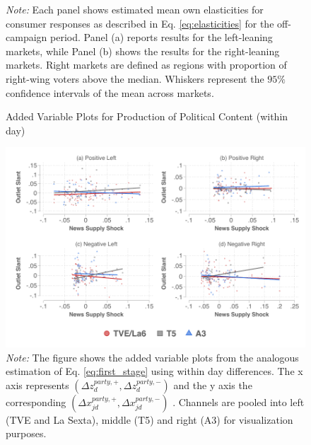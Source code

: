 \documentclass[12pt]{article}
\begin{document}
\begin{figure}[!htbp]
		\vspace{0.5em} %
		
		\captionsetup{justification=justified}
		\caption*{\small \textit{Note:} Each panel shows estimated mean own elasticities for consumer responses  as described in Eq. \eqref{eq:elasticities} for the off-campaign period. Panel (a) reports results for the left-leaning markets, while Panel (b) shows the results for the right-leaning markets. Right markets are defined as regions with proportion of right-wing voters above the median. Whiskers represent the $95\%$ confidence intervals of the mean across markets.}
	\end{figure}
	
	
	
	\begin{figure}[ht!]
		\centering
		\caption{Added Variable Plots for Production of Political Content (within day)}
		\includegraphics[width=160mm]{figures/fwl_plots_lowess_diff_costs_v2}
		\caption*{\small \textit{Note:} The figure shows the added variable plots from the analogous estimation of Eq. \eqref{eq:first_stage} using within day differences. The x axis represents $\left(\Delta z_d^{party,+},\Delta z_d^{party,-}\right) $ and the y axis the corresponding  $\left(\Delta x_{jd}^{party,+},\Delta x_{jd}^{party,-}\right) $   . Channels are pooled into left (TVE and La Sexta), middle (T5) and right (A3) for visualization purposes.  }
		\label{fig:fwl_diff}
	\end{figure}
	
	
	
\end{document}

